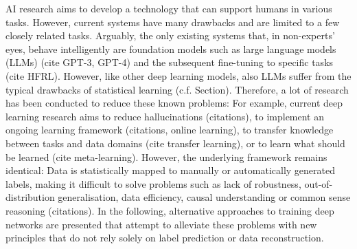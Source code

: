 AI research aims to develop a technology that can support humans in various tasks. However, current systems have many drawbacks and are limited to a few closely related tasks. Arguably, the only existing systems that, in non-experts' eyes, behave intelligently are foundation models such as large language models (LLMs) (cite GPT-3, GPT-4) and the subsequent fine-tuning to specific tasks (cite HFRL). However, like other deep learning models, also LLMs suffer from the typical drawbacks of statistical learning (c.f. Section). Therefore, a lot of research has been conducted to reduce these known problems: For example, current deep learning research aims to reduce hallucinations (citations), to implement an ongoing learning framework (citations, online learning), to transfer knowledge between tasks and data domains (cite transfer learning), or to learn what should be learned (cite meta-learning). However, the underlying framework remains identical: Data is statistically mapped to manually or automatically generated labels, making it difficult to solve problems such as lack of robustness,  out-of-distribution generalisation, data efficiency, causal understanding or common sense reasoning (citations). In the following, alternative approaches to training deep networks are presented that attempt to alleviate these problems with new principles that do not rely solely on label prediction or data reconstruction. 

